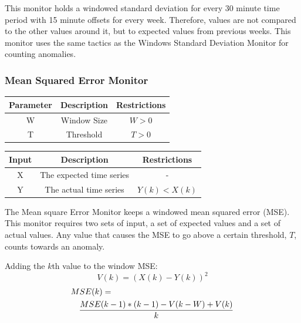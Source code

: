 \documentclass[12pt]{ucthesis}
\begin{document}
This monitor holds a windowed standard deviation for every 30 minute time period with 15 minute offsets
for every week. Therefore, values are not compared to the other values around it, but to expected values from
previous weeks. This monitor uses the same tactics as the Windows Standard Deviation Monitor for counting anomalies.

\subsubsection{Mean Squared Error Monitor}
\label{outage-detection-monitors-MSE}
\begin{table}[H]
   \begin{center}
      \begin{tabular}{|c|c|c|}
         \hline
            Parameter & Description & Restrictions \\
         \hline
            W & Window Size & $ W > 0 $\\
         \hline
            T & Threshold & $ T > 0 $\\
         \hline
      \end{tabular}
   \end{center}
\end{table}

\begin{table}[H]
   \begin{center}
      \begin{tabular}{|c|c|c|}
         \hline
            Input & Description & Restrictions \\
         \hline
            X & The expected time series & - \\
         \hline
            Y & The actual time series & $ Y(k) < X(k) $ \\
         \hline
      \end{tabular}
   \end{center}
\end{table}

The Mean square Error Monitor keeps a windowed mean squared error (MSE). This monitor requires two sets of input, a set
of expected values and a set of actual values. Any value that causes the MSE to go above a certain threshold, $T$,
counts towards an anomaly.

Adding the $k$th value to the window MSE:
$$
   V(k) = (X(k) - Y(k))^{2}
$$
\begin{eqnarray*}
   \lefteqn{MSE(k) = }\\
   && \frac{MSE(k - 1) * (k - 1) - V(k - W) + V(k)}{k}
\end{eqnarray*}
\end{document}
